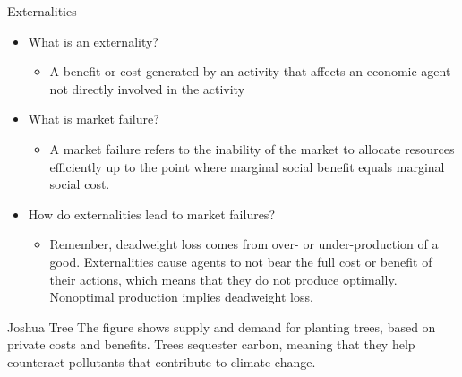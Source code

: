 \documentclass{beamer}
\begin{document}
\begin{frame}{Externalities}
    \begin{itemize}
        \item What is an externality?
        \begin{itemize}
            \item A benefit or cost generated by an activity that affects an economic agent not directly involved in the activity
        \end{itemize}
        \item What is market failure?
        \begin{itemize}
            \item A market failure refers to the inability of the market to allocate resources efficiently up to the point where marginal social benefit equals marginal social cost.
        \end{itemize}
        \item How do externalities lead to market failures?
        \begin{itemize}
            \item Remember, deadweight loss comes from over- or under-production of a good. Externalities cause agents to not bear the full cost or benefit of their actions, which means that they do not produce optimally. Nonoptimal production implies deadweight loss.
        \end{itemize}
    \end{itemize}
\end{frame}

\begin{frame}{Joshua Tree}
    The figure shows supply and demand for planting trees, based on private costs and benefits. Trees sequester carbon, meaning that they help counteract pollutants that contribute to climate change.
    \begin{center}
    \end{center}
\end{frame}
\end{document}
